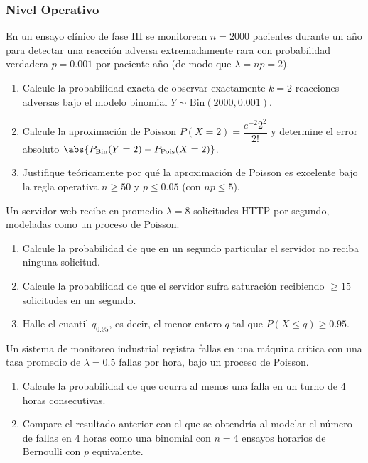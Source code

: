 \subsubsection*{Nivel Operativo}

\begin{problema}
	\label{prob:3.7.4}
	En un ensayo clínico de fase III se monitorean $n = 2000$ pacientes durante un año para detectar una reacción adversa extremadamente rara con probabilidad verdadera $p = 0.001$ por paciente-año (de modo que $\lambda = np = 2$).
	\begin{enumerate}
		\item Calcule la probabilidad exacta de observar exactamente $k = 2$ reacciones adversas bajo el modelo binomial $Y \sim \text{Bin}(2000, 0.001)$.
		\item Calcule la aproximación de Poisson $P(X = 2) = \dfrac{e^{-2} 2^{2}}{2!}$ y determine el error absoluto $\abs{P_{\text{Bin}}(Y=2) - P_{\text{Pois}}(X=2)}$.
		\item Justifique teóricamente por qué la aproximación de Poisson es excelente bajo la regla operativa $n \ge 50$ y $p \le 0.05$ (con $np \le 5$).
	\end{enumerate}
\end{problema}

\begin{problema}
	\label{prob:3.7.5}
	Un servidor web recibe en promedio $\lambda = 8$ solicitudes HTTP por segundo, modeladas como un proceso de Poisson.
	\begin{enumerate}
		\item Calcule la probabilidad de que en un segundo particular el servidor no reciba ninguna solicitud.
		\item Calcule la probabilidad de que el servidor sufra saturación recibiendo $\ge 15$ solicitudes en un segundo.
		\item Halle el cuantil $q_{0.95}$, es decir, el menor entero $q$ tal que $P(X \le q) \ge 0.95$.
	\end{enumerate}
\end{problema}

\begin{problema}
	\label{prob:3.7.6}
	Un sistema de monitoreo industrial registra fallas en una máquina crítica con una tasa promedio de $\lambda = 0.5$ fallas por hora, bajo un proceso de Poisson.
	\begin{enumerate}
		\item Calcule la probabilidad de que ocurra al menos una falla en un turno de $4$ horas consecutivas.
		\item Compare el resultado anterior con el que se obtendría al modelar el número de fallas en $4$ horas como una binomial con $n = 4$ ensayos horarios de Bernoulli con $p$ equivalente.
	\end{enumerate}
\end{problema}

